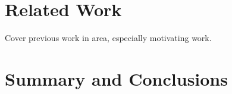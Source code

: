 \documentclass{sig-alternate}
\begin{document}
\section{Related Work}
Cover previous work in area, especially motivating work.

\section{Summary and Conclusions}




\end{document}
